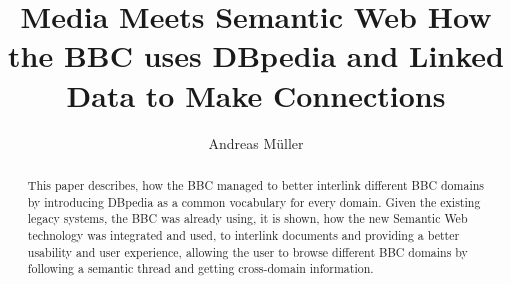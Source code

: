 \documentclass{llncs}
\begin{document}
%
\frontmatter          %
%
\pagestyle{headings}  %
%
\mainmatter              %
%
\title{Media Meets Semantic Web \newline How the BBC uses DBpedia and Linked Data \newline to Make Connections}
%
%
\author{Andreas M\"{u}ller}
%
%
%

\maketitle              %

\begin{abstract} %
This paper describes, how the BBC managed to better interlink different BBC domains by introducing DBpedia as a common vocabulary for every domain. Given the existing legacy systems, the BBC was already using, it is shown, how the new Semantic Web technology was integrated and used, to interlink documents and providing a better usability and user experience, allowing the user to browse different BBC domains by following a semantic thread and getting cross-domain information.
\end{abstract}
%
\end{document}
